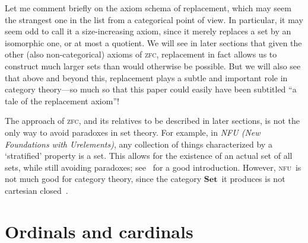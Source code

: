 \documentclass[12pt]{amsart}
\newcommand{\Set}{\ensuremath{\mathbf{Set}}}
\def\zfc{\textsc{zfc}}
\def\nfu{\textsc{nfu}}
\begin{document}
Let me comment briefly on the axiom schema of replacement, which may
seem the strangest one in the list from a categorical point of view.
In particular, it may seem odd to call it a size-increasing axiom,
since it merely replaces a set by an isomorphic one, or at most a
quotient.  We will see in later sections that given the other (also
non-categorical) axioms of \zfc, replacement in fact allows us to
construct much larger sets than would otherwise be possible.  But we
will also see that above and beyond this, replacement plays a subtle
and important role in category theory---so much so that this paper
could easily have been subtitled ``a tale of the replacement axiom''!

\begin{rmk}
  The approach of \zfc, and its relatives to be described in later
  sections, is not the only way to avoid paradoxes in set theory.  For
  example, in \emph{NFU (New Foundations with Urelements)}, any
  collection of things characterized by a `stratified' property is a
  set.  This allows for the existence of an actual set of all sets,
  while still avoiding paradoxes; see~\cite{holmes:nfu} for a good
  introduction.  However, \nfu\ is not much good for category theory,
  since the category \Set\ it produces is not cartesian
  closed~\cite{mclarty:nf-not-cc}.
\end{rmk}


\section{Ordinals and cardinals}
\label{sec:ordinals}
\end{document}
